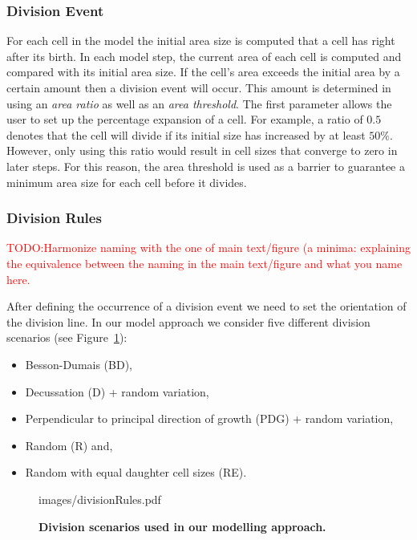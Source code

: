 \documentclass[11pt,a4paper, final]{article}
\newcommand{\TODO}[1]{
\textcolor{red}{TODO:#1}
}
\newenvironment{Itemize}{
 \begin{itemize}[leftmargin=0.5cm]{
}}{\end{itemize}}
\begin{document}
\subsubsection{Division Event}
\noindent
For each cell in the model the initial area size is computed that a cell has right after its birth. In each model step, the current area of each cell is computed and compared with its initial area size. If the cell's area exceeds the initial area by a certain amount then a division event will occur. This amount is determined in using an \textit{area ratio} as well as an \textit{area threshold}. The first parameter allows the user to set up the percentage expansion of a cell. For example, a ratio of $0.5$ denotes that the cell will divide if its initial size has increased by at least $50\%$. However, only using this ratio would result in cell sizes that converge to zero in later steps. For this reason, the area threshold is used as a barrier to guarantee a minimum area size for each cell before it divides.

\subsubsection{Division Rules}
\label{sec:divisionRules}
\TODO{Harmonize naming with the one of main text/figure (a minima: explaining the equivalence between the naming in the main text/figure and what you name here.}
\noindent
After defining the occurrence of a division event we need to set the orientation of the division line. In our model approach we consider five different division scenarios (see Figure~\ref{fig:divisionRules}):
\begin{Itemize}
\item Besson-Dumais (BD),
\item Decussation (D) + random variation,
\item Perpendicular to principal direction of growth (PDG) + random variation,
\item Random (R) and,
\item Random with equal daughter cell sizes (RE).
\end{Itemize}
%
\begin{figure}[htbp]
	\begin{center}
		\begin{overpic}[width=1.\linewidth]{images/divisionRules.pdf}
		\end{overpic}
\caption[Division scenarios used in our modelling approach.]
{
{\bf Division scenarios used in our modelling approach.}
}
	\label{fig:divisionRules}
	\end{center}
\end{figure}
%
\end{document}
